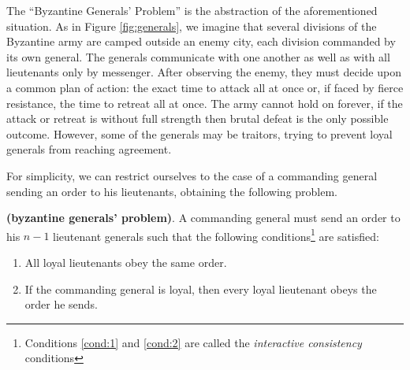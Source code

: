 \bigskip
\noindent
The \enquote{Byzantine Generals' Problem} is the abstraction of the aforementioned situation. As in Figure \ref{fig:generals}, we imagine that several divisions of the Byzantine army are camped outside an enemy city, each division commanded by its own general. The generals communicate with one another as well as with all lieutenants only by messenger. After observing the enemy, they must decide upon a common plan of action: the exact time to attack all at once or, if faced by fierce resistance, the time to retreat all at once. The army cannot hold on forever, if the attack or retreat is without full strength then brutal defeat is the only possible outcome. However, some of the generals may be traitors, trying to prevent loyal generals from reaching agreement. 

\bigskip
\noindent
For simplicity, we can restrict ourselves to the case of a commanding general sending an order to his lieutenants, obtaining the following problem.
\begin{mydef}{\bf (byzantine generals' problem)}.
\label{def:bgp}
    A commanding general must send an order to his $n-1$ lieutenant generals such that the following conditions\footnote{Conditions \ref{cond:1} and \ref{cond:2} are called the \textit{interactive consistency} conditions} are satisfied:
    \begin{enumerate}
        \item \label{cond:1} All loyal lieutenants obey the same order.
        \item \label{cond:2} If the commanding general is loyal, then every loyal lieutenant obeys the order he sends.
    \end{enumerate}
\end{mydef}

\bigskip
